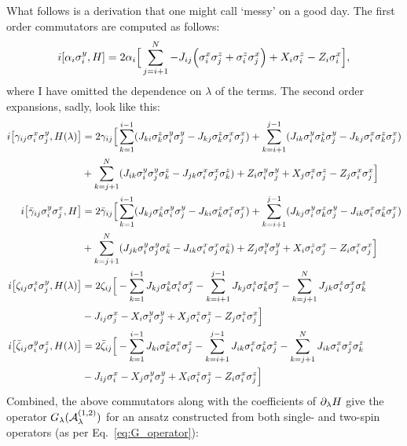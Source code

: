 What follows is a derivation that one might call `messy' on a good day. The first order commutators are computed as follows:
\begin{equation}\label{eq:first_order_AGP_commutator}
        i\comm{\alpha_i \sy_i}{H} = 2\alpha_i \Big[ \sum_{j = i+1}^{N} - J_{ij} \Big( \sx_i \sz_j + \sz_i \sx_j \Big) + X_i \sz_i - Z_i \sx_i \Big],
\end{equation}
where I have omitted the dependence on $\lambda$ of the terms. The second order expansions, sadly, look like this:
\begin{equation}
    \begin{aligned}
        i\comm{\gamma_{ij} \sx_i \sy_j}{H(\lambda)} &= 2\gamma_{ij} \Big[ \sum_{k = 1}^{i-1} (J_{ki} \sz_k \sy_i \sy_j - J_{kj} \sz_k \sx_i \sx_j)  + \sum_{k = i + 1}^{j-1} (J_{ik} \sy_i \sz_k \sy_j - J_{kj} \sx_i \sz_k \sx_j) \\ 
        &+ \sum_{k = j + 1}^N (J_{ik} \sy_i \sy_j \sz_k - J_{jk} \sx_i \sx_j \sz_k) + Z_i \sy_i \sy_j + X_j \sx_i \sz_j - Z_j \sx_i \sx_j \Big] \\
        i\comm{\Bar{\gamma}_{ij} \sy_i \sx_j}{H} &= 2\Bar{\gamma}_{ij} \Big[ \sum_{k = 1}^{i-1} (J_{kj} \sz_k \sy_i \sy_j - J_{ki} \sz_k \sx_i \sx_j) + \sum_{k = i + 1}^{j-1} (J_{kj} \sy_i \sz_k \sy_j - J_{ik} \sx_i \sz_k \sx_j) \\ 
        &+ \sum_{k = j + 1}^N (J_{jk} \sy_i \sy_j \sz_k - J_{ik} \sx_i \sx_j \sz_k)+ Z_j \sy_i \sy_j + X_i \sz_i \sx_j - Z_i \sx_i \sx_j \Big] \\ 
        i\comm{\zeta_{ij} \sz_i \sy_j}{H(\lambda)} &= 2\zeta_{ij} \Big[ -\sum_{k = 1}^{i-1} J_{kj} \sz_k \sz_i \sx_j - \sum_{k = i + 1}^{j-1} J_{kj} \sz_i \sz_k \sx_j - \sum_{k = j + 1}^N J_{jk} \sz_i \sx_j \sz_k  \\
        &- J_{ij} \sx_j - X_i \sy_i \sy_j + X_j \sz_i \sz_j - Z_j \sz_i\sx_j \Big] \\
        i\comm{\Bar{\zeta}_{ij} \sy_i \sz_j}{H(\lambda)} &= 2\Bar{\zeta}_{ij} \Big[ - \sum_{k = 1}^{i-1} J_{ki} \sz_k \sx_i \sz_j - \sum_{k = i + 1}^{j-1} J_{ik} \sx_i \sz_k \sz_j 
        - \sum_{k = j + 1}^N J_{ik} \sx_i \sz_j \sz_k \\
        &- J_{ij} \sx_i - X_j \sy_i \sy_j + X_i \sz_i \sz_j - Z_i \sx_i \sz_j \Big]
    \end{aligned}
\end{equation}
Combined, the above commutators along with the coefficients of $\partial_{\lambda} H$ give the operator $G_{\lambda}(\mathcal{A}_{\lambda}^{(1,2)})$ for an ansatz  constructed from both single- and two-spin operators (as per Eq.~\eqref{eq:G_operator}):
